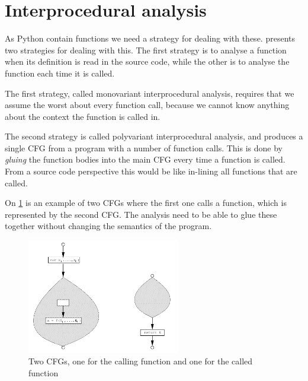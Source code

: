 \section{Interprocedural analysis}
As Python contain functions we need a strategy for dealing with these.
\citet{schwartzbach} presents two strategies for dealing with this.
The first strategy is to analyse a function when its definition is read in the source code, while the other is to analyse the function each time it is called.

The first strategy, called monovariant interprocedural analysis, requires that we assume the worst about every function call, because we cannot know anything about the context the function is called in.

The second strategy is called polyvariant interprocedural analysis, and produces a single CFG from a program with a number of function calls.
This is done by \emph{gluing} the function bodies into the main CFG every time a function is called.
From a source code perspective this would be like in-lining all functions that are called.


On \cref{interprocedural_cfgs} is an example of two CFGs where the first one calls a function, which is represented by the second CFG.
The analysis need to be able to glue these together without changing the semantics of the program.

\begin{figure}[H]
  \center
  \includegraphics[width=0.6\textwidth]{figures/interprocedural_cfgs}
  \caption{Two CFGs, one for the calling function and one for the called function}
  \label{interprocedural_cfgs}
\end{figure}


